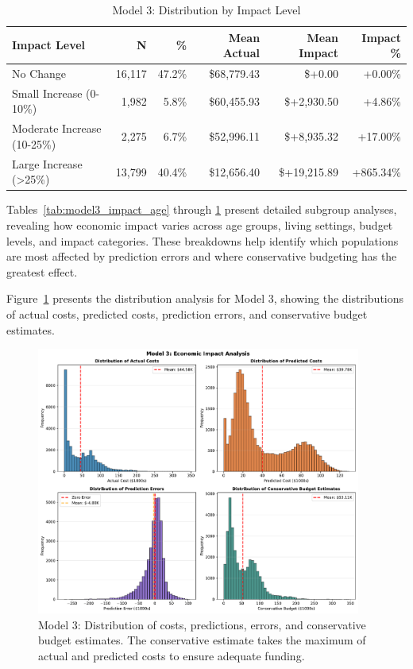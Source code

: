 \begin{table}[htbp]
\centering
\small
\caption{Model 3: Distribution by Impact Level}
\label{tab:model3_impact_distribution}
\begin{tabular}{lrrrrr}
\toprule
\textbf{Impact Level} & \textbf{N} & \textbf{\%} & \textbf{Mean Actual} & \textbf{Mean Impact} & \textbf{Impact \%} \\
\midrule
No Change & 16,117 & 47.2\% & \$68,779.43 & \$+0.00 & +0.00\% \\
Small Increase (0-10\%) & 1,982 & 5.8\% & \$60,455.93 & \$+2,930.50 & +4.86\% \\
Moderate Increase (10-25\%) & 2,275 & 6.7\% & \$52,996.11 & \$+8,935.32 & +17.00\% \\
Large Increase (>25\%) & 13,799 & 40.4\% & \$12,656.40 & \$+19,215.89 & +865.34\% \\
\bottomrule
\end{tabular}
\end{table}

Tables~\ref{tab:model3_impact_age} through \ref{tab:model3_impact_distribution} present detailed subgroup analyses, revealing how economic impact varies across age groups, living settings, budget levels, and impact categories. These breakdowns help identify which populations are most affected by prediction errors and where conservative budgeting has the greatest effect.

Figure~\ref{fig:model3_impact_histograms} presents the distribution analysis for Model 3, showing the distributions of actual costs, predicted costs, prediction errors, and conservative budget estimates.

\begin{figure}[htbp]
\centering
\includegraphics[width=0.95\textwidth]{figures/model_3_Impact_Histograms.pdf}
\caption{Model 3: Distribution of costs, predictions, errors, and conservative budget estimates. The conservative estimate takes the maximum of actual and predicted costs to ensure adequate funding.}
\label{fig:model3_impact_histograms}
\end{figure}

